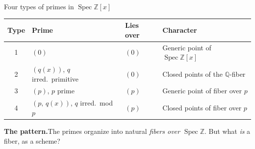 \documentclass[aspectratio=169,12pt]{beamer}
\begin{document}
\begin{frame}{Four types of primes in $\operatorname{Spec}\mathbb{Z}[x]$}
  \renewcommand{\arraystretch}{1.55}
  \begin{tabular}{@{\hspace{4pt}}clll@{\hspace{4pt}}}
    \toprule
    \textbf{Type} & \textbf{Prime} & \textbf{Lies over} & \textbf{Character} \\
    \midrule
    1 & $(0)$
      & $(0)$
      & Generic point of $\operatorname{Spec}\mathbb{Z}[x]$ \\
    2 & $(q(x))$,\; $q$ irred.\ primitive
      & $(0)$
      & Closed points of the $\mathbb{Q}$-fiber \\
    3 & $(p)$,\; $p$ prime
      & $(p)$
      & Generic point of fiber over $p$ \\
    4 & $(p,\,q(x))$,\; $q$ irred.\ mod $p$
      & $(p)$
      & Closed points of fiber over $p$ \\
    \bottomrule
  \end{tabular}

  \bigskip

  \textbf{The pattern.}\enspace The primes organize into natural
  \emph{fibers over $\operatorname{Spec}\mathbb{Z}$}.
  But what \emph{is} a fiber, as a scheme?
\end{frame}
\end{document}
